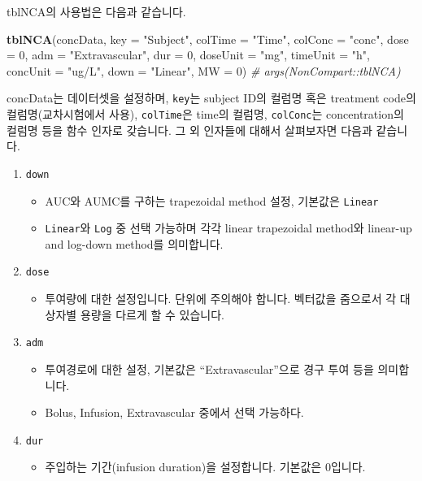 \documentclass[12pt,]{krantz}
\newenvironment{Shaded}{\begin{snugshade}}{\end{snugshade}}
\newcommand{\KeywordTok}[1]{\textcolor[rgb]{0.13,0.29,0.53}{\textbf{#1}}}
\newcommand{\DataTypeTok}[1]{\textcolor[rgb]{0.13,0.29,0.53}{#1}}
\newcommand{\DecValTok}[1]{\textcolor[rgb]{0.00,0.00,0.81}{#1}}
\newcommand{\StringTok}[1]{\textcolor[rgb]{0.31,0.60,0.02}{#1}}
\newcommand{\CommentTok}[1]{\textcolor[rgb]{0.56,0.35,0.01}{\textit{#1}}}
\newcommand{\NormalTok}[1]{#1}
\providecommand{\tightlist}{%
  \setlength{\itemsep}{0pt}\setlength{\parskip}{0pt}}
\theoremstyle{definition}
\theoremstyle{definition}
\theoremstyle{definition}
\theoremstyle{remark}
\begin{document}
tblNCA의 사용법은 다음과 같습니다.

\begin{Shaded}
\begin{Highlighting}[]
\KeywordTok{tblNCA}\NormalTok{(concData, }\DataTypeTok{key =} \StringTok{"Subject"}\NormalTok{, }\DataTypeTok{colTime =} \StringTok{"Time"}\NormalTok{, }\DataTypeTok{colConc =} \StringTok{"conc"}\NormalTok{, }
       \DataTypeTok{dose =} \DecValTok{0}\NormalTok{, }\DataTypeTok{adm =} \StringTok{"Extravascular"}\NormalTok{, }\DataTypeTok{dur =} \DecValTok{0}\NormalTok{, }\DataTypeTok{doseUnit =} \StringTok{"mg"}\NormalTok{, }
       \DataTypeTok{timeUnit =} \StringTok{"h"}\NormalTok{, }\DataTypeTok{concUnit =} \StringTok{"ug/L"}\NormalTok{, }\DataTypeTok{down =} \StringTok{"Linear"}\NormalTok{, }\DataTypeTok{MW =} \DecValTok{0}\NormalTok{)}
\CommentTok{# args(NonCompart::tblNCA)}
\end{Highlighting}
\end{Shaded}

concData는 데이터셋을 설정하며, \texttt{key}는 subject ID의 컬럼명 혹은
treatment code의 컬럼명(교차시험에서 사용), \texttt{colTime}은 time의
컬럼명, \texttt{colConc}는 concentration의 컬럼명 등을 함수 인자로
갖습니다. 그 외 인자들에 대해서 살펴보자면 다음과 같습니다.

\begin{enumerate}
\def\labelenumi{\arabic{enumi}.}
\tightlist
\item
  \texttt{down}

  \begin{itemize}
  \tightlist
  \item
    AUC와 AUMC를 구하는 trapezoidal method 설정, 기본값은
    \texttt{Linear}
  \item
    \texttt{Linear}와 \texttt{Log} 중 선택 가능하며 각각 linear
    trapezoidal method와 linear-up and log-down method를 의미합니다.
  \end{itemize}
\item
  \texttt{dose}

  \begin{itemize}
  \tightlist
  \item
    투여량에 대한 설정입니다. 단위에 주의해야 합니다. 벡터값을 줌으로서
    각 대상자별 용량을 다르게 할 수 있습니다.
  \end{itemize}
\item
  \texttt{adm}

  \begin{itemize}
  \tightlist
  \item
    투여경로에 대한 설정, 기본값은 ``Extravascular''으로 경구 투여 등을
    의미합니다.
  \item
    Bolus, Infusion, Extravascular 중에서 선택 가능하다.
  \end{itemize}
\item
  \texttt{dur}

  \begin{itemize}
  \tightlist
  \item
    주입하는 기간(infusion duration)을 설정합니다. 기본값은 0입니다.
  \end{itemize}
\end{enumerate}
\end{document}
